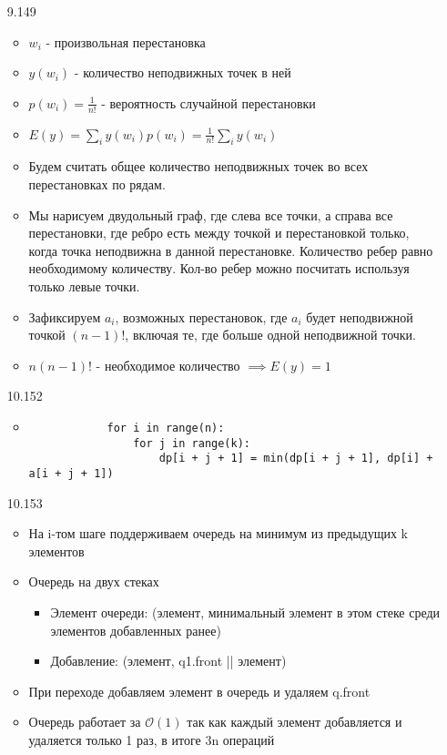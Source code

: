 \documentclass{article}
\author{Бугрий Илья M3134}
\date{November 2023}
\begin{document}
\begin{enumerate}
    \item [9.149]
    \begin{itemize}
        \item $w_i$ - произвольная перестановка
        \item $y(w_i)$ - количество неподвижных точек в ней
        \item $p(w_i) = \frac{1}{n!}$ - вероятность случайной перестановки
        \item $E(y) = \sum\limits_{i}{y(w_i)p(w_i)} = \frac{1}{n!}\sum\limits_{i}{y(w_i)}$
        \item Будем считать общее количество неподвижных точек во всех перестановках по рядам.
        \item Мы нарисуем двудольный граф, где слева все точки, а справа все перестановки, где ребро есть между точкой и перестановкой только, \\
        когда точка неподвижна в данной перестановке. Количество ребер равно необходимому количеству. Кол-во ребер можно посчитать используя только левые точки.
        \item Зафиксируем $a_i$, возможных перестановок, где $a_i$ будет неподвижной точкой $(n-1)!$, включая те, где больше одной неподвижной точки.
        \item $n (n-1)!$ - необходимое количество $\implies E(y) = 1$
    \end{itemize}

    \item [10.152] 
    \begin{itemize}
        \item 
        \begin{lstlisting}
            for i in range(n):
                for j in range(k):
                    dp[i + j + 1] = min(dp[i + j + 1], dp[i] + a[i + j + 1])
        \end{lstlisting}
    \end{itemize}

    \item [10.153]
    \begin{itemize}
        \item На i-том шаге поддерживаем очередь на минимум из предыдущих k элементов 
        \item Очередь на двух стеках
        \begin{itemize}
            \item Элемент очереди: (элемент, минимальный элемент в этом стеке среди элементов добавленных ранее)
            \item Добавление: (элемент, q1.front || элемент)
        \end{itemize}
        \item При переходе добавляем элемент в очередь и удаляем q.front
        \item Очередь работает за $\mathcal{O}(1)$ так как каждый элемент добавляется и удаляется только 1 раз, в итоге 3n операций
    \end{itemize}


\end{enumerate}
\end{document}
